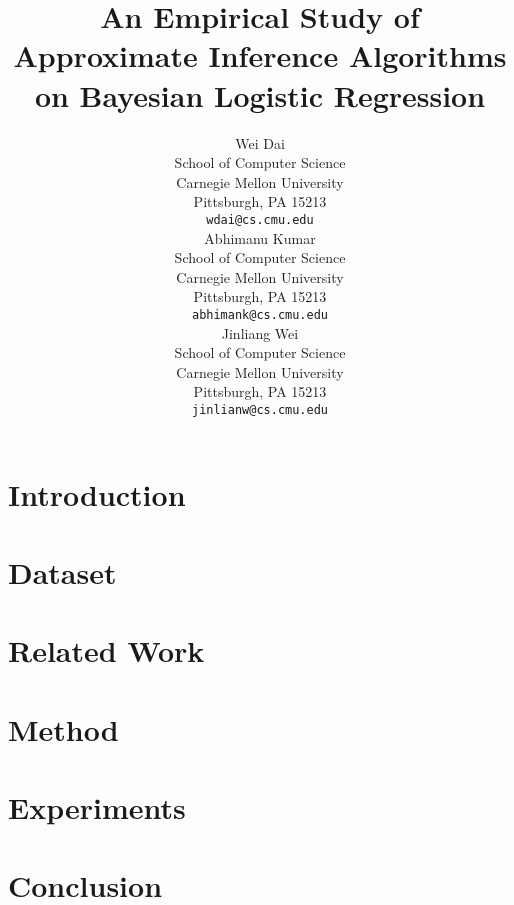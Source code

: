 \documentclass{article}
\title{An Empirical Study of Approximate Inference Algorithms on Bayesian
Logistic Regression}
\author{
Wei Dai \\
School of Computer Science \\
Carnegie Mellon University\\
Pittsburgh, PA 15213\\
\texttt{wdai@cs.cmu.edu}\\
\And
Abhimanu Kumar \\
School of Computer Science \\
Carnegie Mellon University\\
Pittsburgh, PA 15213\\
\texttt{abhimank@cs.cmu.edu}\\
\And
Jinliang Wei \\
School of Computer Science \\
Carnegie Mellon University\\
Pittsburgh, PA 15213\\
\texttt{jinlianw@cs.cmu.edu}\\
}
\begin{document}
\maketitle

\setcounter{page}{1}

\section{Introduction}

\section{Dataset}

\section{Related Work}

\section{Method}

\section{Experiments}

\section{Conclusion}

\end{document}
